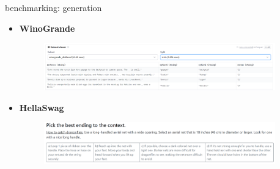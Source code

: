\begin{vbframe}{benchmarking: generation}

\vfill

\begin{itemize}
	\item \textbf{WinoGrande} 
	\begin{figure}
		\centering
		\includegraphics[width = 10cm]{figure/winogrande.png}\\ 
	\end{figure}
	\item \textbf{HellaSwag} 
	\begin{figure}
		\centering
		\includegraphics[width = 10cm]{figure/hellaswag.png}\\ 
	\end{figure}
\end{itemize}

\vfill

\end{vbframe}


